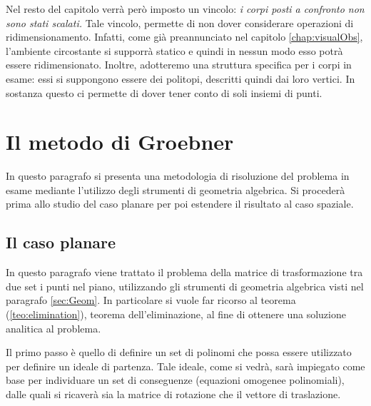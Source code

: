 Nel resto del capitolo verrà però imposto un vincolo: \textit{i corpi posti a confronto non sono stati scalati.} Tale vincolo, permette di non dover considerare operazioni di ridimensionamento. Infatti, come già preannunciato nel capitolo \ref{chap:visualObs}, l'ambiente circostante si supporrà statico e quindi in nessun modo esso potrà essere ridimensionato.
Inoltre, adotteremo una struttura specifica per i corpi in esame: essi si suppongono essere dei politopi, descritti quindi dai loro vertici. In sostanza questo ci permette di dover tener conto di soli insiemi di punti. 




\section{Il metodo di Groebner}
\label{sec:groeb}
In questo paragrafo si presenta una metodologia di risoluzione del problema in esame mediante l'utilizzo degli strumenti di geometria algebrica. Si procederà prima allo studio del caso planare per poi estendere il risultato al caso spaziale.

\subsection{Il caso planare}
\label{sec:groeb:plan}
In questo paragrafo viene trattato il problema della matrice di trasformazione tra due set i punti nel piano, utilizzando gli strumenti di geometria algebrica visti nel paragrafo \ref{sec:Geom}. In particolare si vuole far ricorso al teorema (\ref{teo:elimination}), teorema dell'eliminazione, al fine di ottenere una soluzione analitica al problema.

Il primo passo è quello di definire un set di polinomi che possa essere utilizzato per definire un ideale di partenza. Tale ideale, come si vedrà, sarà impiegato come base per individuare un set di conseguenze (equazioni omogenee polinomiali), dalle quali si ricaverà sia la matrice di rotazione che il vettore di traslazione.


